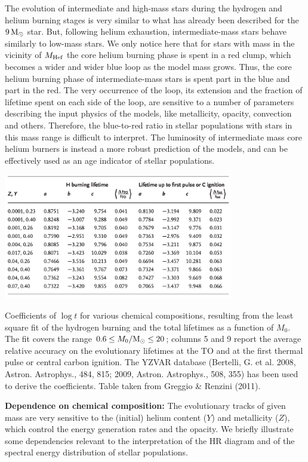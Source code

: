 \documentclass[a4paper,10pt]{article}
\begin{document}
{\noindent}The evolution of intermediate and high-mass stars during the hydrogen and helium burning stages is very similar to what has already been described for the $9\,{\rm M_\odot}$ star. But, following helium exhaustion, intermediate-mass stars behave similarly to low-mass stars. We only notice here that for stars with mass in the vicinity of $M_{\rm Hef}$ the core helium burning phase is spent in a red clump, which becomes a wider and wider blue loop as the model mass grows. Thus, the core helium burning phase of intermediate-mass stars is spent part in the blue and part in the red. The very occurrence of the loop, its extension and the fraction of lifetime spent on each side of the loop, are sensitive to a number of parameters describing the input physics of the models, like metallicity, opacity, convection and others. Therefore, the blue-to-red ratio in stellar populations with stars in this mass range is difficult to interpret. The luminosity of intermediate mass core helium burners is instead a more robust prediction of the models, and can be effectively used as an age indicator of stellar populations.

\begin{table}[t]
    \centering
    \includegraphics[width=10cm]{figures/HRD_Z_coeff.png}
    \caption{\footnotesize{Coefficients of $\log t$ for various chemical compositions, resulting from the least square fit of the hydrogen burning and the total lifetimes as a function of $M_0$. The fit covers the range $0.6\leq M_0/{\rm M_\odot} \leq20$; columns 5 and 9 report the average relative accuracy on the evolutionary lifetimes at the TO and at the first thermal pulse or central carbon ignition. The YZVAR database (Bertelli, G. et al. 2008, Astron. Astrophys., 484, 815; 2009, Astron. Astrophys., 508, 355) has been used to derive the coefficients. Table taken from Greggio \& Renzini (2011).}}
    \label{table:hrdz_coeff}
\end{table}

{\noindent}\textbf{Dependence on chemical composition:} The evolutionary tracks of given mass are very sensitive to the (initial) helium content ($Y$) and metallicity ($Z$), which control the energy generation rates and the opacity. We briefly illustrate some dependencies relevant to the interpretation of the HR diagram and of the spectral energy distribution of stellar populations.
\end{document}
